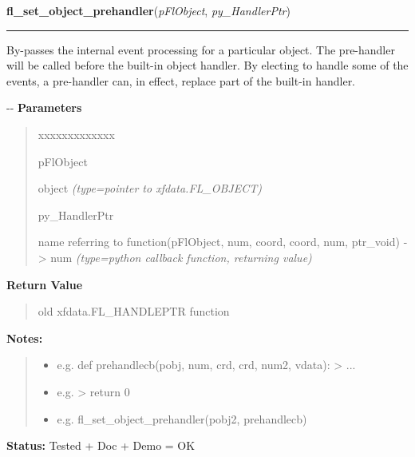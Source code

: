 \hspace{.8\funcindent}\begin{boxedminipage}{\funcwidth}

    \raggedright \textbf{fl\_set\_object\_prehandler}(\textit{pFlObject}, \textit{py\_HandlerPtr})

    \vspace{-1.5ex}

    \rule{\textwidth}{0.5\fboxrule}
\setlength{\parskip}{2ex}

By-passes the internal event processing for a particular object. The
pre-handler will be called before the built-in object handler. By electing
to handle some of the events, a pre-handler can, in effect, replace part
of the built-in handler.

-{}-
\setlength{\parskip}{1ex}
      \textbf{Parameters}
      \vspace{-1ex}

      \begin{quote}
        \begin{Ventry}{xxxxxxxxxxxxx}

          \item[pFlObject]


object
            {\it (type=pointer to xfdata.FL\_OBJECT)}

          \item[py\_HandlerPtr]


name referring to function(pFlObject, num, coord, coord, num,
ptr\_void) -> num
            {\it (type=python callback function, returning value)}

        \end{Ventry}

      \end{quote}

      \textbf{Return Value}
    \vspace{-1ex}

      \begin{quote}

old xfdata.FL\_HANDLEPTR function
      \end{quote}

\textbf{Notes:}
\begin{quote}
  \begin{itemize}

  \item
    \setlength{\parskip}{0.6ex}

e.g. def prehandlecb(pobj, num, crd, crd, num2, vdata): > ...


  \item 
e.g. > return 0


  \item 
e.g. fl\_set\_object\_prehandler(pobj2, prehandlecb)


\end{itemize}

\end{quote}

\textbf{Status:} 
Tested + Doc + Demo = OK


    \end{boxedminipage}


